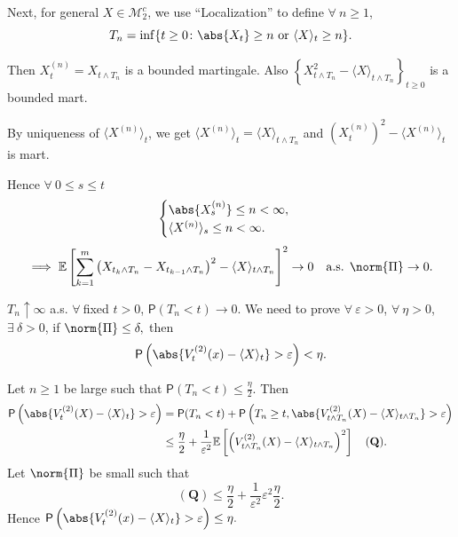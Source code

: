 {    Next, for general $X \in \mathcal{M}_2^c$, we use ``Localization'' to define $\forall~n \geq 1$,
    $$
    T_n = \inf \{ t \geq 0 \colon \abs{ X_t }\geq n \text{ or } \langle X \rangle_{t} \geq n \}.
    $$

    Then $X_t^{(n)} = X_{t \wedge T_n}$ is a bounded martingale. Also $\left\{ X_{t \wedge T_n}^2 - \langle X \rangle_{t \wedge T_n}  \right\}_{t \geq 0}$ is a bounded mart.

    By uniqueness of $\langle X^{(n)} \rangle_{t} $, we get $\langle X^{(n)} \rangle_{t} = \langle X \rangle_{t \wedge T_n}  $ and $(X_t^{(n)})^2 - \langle X^{(n)} \rangle_{t} $ is mart.

    Hence $\forall~ 0 \leq s \leq t$
    $$
    \begin{cases}
        \abs{ X_s^{(n)} } \leq n < \infty, \\
        \langle X^{(n)} \rangle_{s} \leq n < \infty. 
    \end{cases}
    $$
    $$
    \implies \mathbb{E}\left[ 
        \sum_{k=1}^{m}\left( X_{t_{k} \wedge T_n} -X_{t_{k-1} \wedge T_n}  \right)^2 - \langle X \rangle_{t \wedge T_n}
        \right]^2 \to 0 \quad \text{a.s. } \norm{ \Pi } \to 0.
    $$

    $T_n \uparrow \infty$ a.s.
    $\forall~$fixed $t >0$, $\mathsf{P}(T_n < t)\to 0$. We need to prove $\forall~\varepsilon > 0$, $\forall~\eta>0$, $\exists~\delta > 0$, if $\norm{ \Pi } \leq \delta,$ then 
    $$
    \mathsf{P}\left( \abs{V_t^{(2)}(x) - \langle X \rangle_{t} }  > \varepsilon \right) < \eta.
    $$

    Let $n \geq 1$ be large such that $\mathsf{P}(T_n < t) \leq \frac{\eta}{2}$. Then 
    $$  
    \begin{aligned}
    \mathsf{P}\left( \abs{V_t^{(2)}(X) - \langle X \rangle_{t} }  > \varepsilon \right) &= \mathsf{P}(T_n < t) + \mathsf{P}\left(  T_n \geq t, \abs{ V_{t \wedge T_n}^{(2)}(X)-\langle X \rangle_{t \wedge T_n}  } > \varepsilon\right)\\
    &\leq \frac{\eta}{2} + \frac{1}{\varepsilon^2}\mathbb{E}\left[ 
        \left( 
            V_{t \wedge T_n}^{(2)}(X) - \langle X \rangle_{t \wedge T_n} 
            \right)^2
        \right]\quad (\textbf{Q}).
    \end{aligned}
    $$
    Let $\norm{  \Pi }$ be small such that 
    $$
    (\textbf{Q}) \leq \frac{\eta}{2} + \frac{1}{\varepsilon^2} \varepsilon^2 \frac{\eta}{2}.
    $$
    Hence $\mathsf{P}\left( \abs{V_t^{(2)}(x) - \langle X \rangle_{t} }  > \varepsilon \right) \leq \eta.$
}

